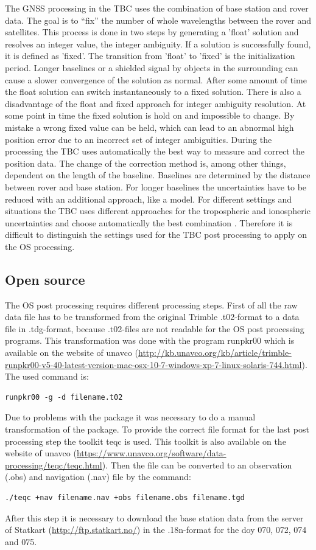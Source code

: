 The GNSS processing in the TBC uses the combination of base station and rover data.
The goal is to “fix” the number of whole wavelengths between the rover and satellites.
This process is done in two steps by generating a 'float' solution and resolves an integer value, the integer ambiguity. 
If a solution is successfully found, it is defined as 'fixed'.
The transition from 'float' to 'fixed' is the initialization period.
Longer baselines or a shielded signal by objects in the surrounding can cause a slower convergence of the solution as normal.
After some amount of time the float solution can switch instantaneously to a fixed solution.
There is also a disadvantage of the float and fixed approach for integer ambiguity resolution.
At some point in time the fixed solution is hold on and impossible to change.
By mistake a wrong fixed value can be held, which can lead to an abnormal high position error due to an incorrect set of integer ambiguities.
During the processing the TBC uses automatically the best way to measure and correct the position data. 
The change of the correction method is, among other things, dependent on the length of the baseline.
Baselines are determined by the distance between rover and base station.
For longer baselines the uncertainties have to be reduced with an additional approach, like a model.
For different settings and situations the TBC uses different approaches for the tropospheric and ionospheric uncertainties and choose automatically the best combination \citep{Trprocess}.
Therefore it is difficult to distinguish the settings used for the TBC post processing to apply on the OS processing.

\subsection{Open source}

The OS post processing requires different processing steps.
First of all the raw data file has to be transformed from the original Trimble .t02-format to a data file in .tdg-format, because .t02-files are not readable for the OS post processing programs.
This transformation was done with the program runpkr00 which is available on the website of unavco (\url{http://kb.unavco.org/kb/article/trimble-runpkr00-v5-40-latest-version-mac-osx-10-7-windows-xp-7-linux-solaris-744.html}).
The used command is: 
\begin{verbatim} 
runpkr00 -g -d filename.t02 
\end{verbatim}
Due to problems with the package it was necessary to do a manual transformation of the package.
To provide the correct file format for the last post processing step the toolkit teqc is used.
This toolkit is also available on the website of unavco (\url{https://www.unavco.org/software/data-processing/teqc/teqc.html}).
Then the file can be converted to an observation (.obs) and navigation (.nav) file by the command:
\begin{verbatim}
./teqc +nav filename.nav +obs filename.obs filename.tgd
\end{verbatim}
After this step it is necessary to download the base station data from the server of Statkart (\url{http://ftp.statkart.no/}) in the .18n-format for the doy 070, 072, 074 and 075.
\medskip

